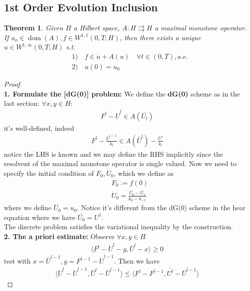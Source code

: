 \documentclass[a4paper,12pt,oneside,fleqn]{book}
\newtheorem{theorem}{Theorem}[section]
\theoremstyle{definition}
\theoremstyle{remark}
\DeclareMathOperator{\dom}{dom}
\begin{document}
\subsection{1st Order Evolution Inclusion}
\begin{theorem}
	Given $H$ a Hilbert space, $A: H \rightrightarrows H$ a maximal monotone operator. If $u_o \in \dom(A), f \in W^{1, 1}(0, T; H)$, then there exists a unique $u \in W^{1, \infty}(0, T; H)$ s.t.
	\begin{align*}
		&1) \quad f \in \dot{u} + A(u)\quad \forall t \in (0, T), a.e.\\
		&2) \quad u(0) = u_0
	\end{align*}
\end{theorem}
\begin{proof}
	\quad\\
	\textbf{1. Formulate the [dG(0)] problem:}
	We define the \textbf{dG(0)} scheme as in the last section: $\forall x, y \in H:$
	\begin{align*}
		 F^l - \dot{U}^l \in A(\bar{U_l})
	\end{align*}
	it's well-defined, indeed
	\begin{align*}
		F^l  - \frac{ \bar{U}^{l-1}}{k_l} \in A(\bar{U}^l) - \frac{U^l}{k_l}
	\end{align*}
	notice the LHS is known and we may define the RHS implicitly since the resolvent of the maximal monotone operator is single valued. Now we need to specify the initial condition of $F_0, \dot{U}_0$, which we define as
	\begin{align*}
		&F_0:= f(0)\\
		&\dot{U}_0 = \frac{\bar{U}_0 - \bar{U}_{1}}{k_0 - k_{-1}}
	\end{align*}
	where we define $\bar{U}_0 = u_0$. Notice it's different from the dG(0) scheme in the hear equation where we have $\bar{U_0} = U^1$. \\
	The discrete problem satisfies the variational inequality by the construction. 
	\quad\\
	\textbf{2. The a priori estimate:}
	Observe $\forall x, y \in H$
	\begin{align*}
		\langle F^l - \dot{U}^l - y, \bar{U}^l - x \rangle \ge 0
	\end{align*}
	test with $x = \bar{U}^{l -1}, y = F^{l -1} - \dot{U}^{l -1}$. Then we have
	\begin{align*}
		\langle \dot{U}^l - \dot{U}^{l -1}, \bar{U}^l - \bar{U}^{l -1} \rangle \le \langle F^l - F^{l -1}, \bar{U^l} - \bar{U}^{l -1} \rangle 
	\end{align*}

\end{proof}
\end{document}
